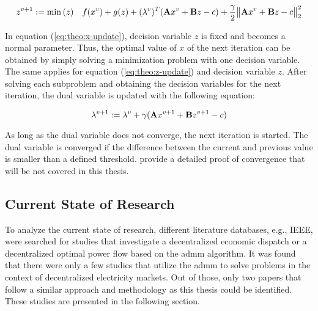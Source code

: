 \begin{equation}
	z^{v+1} := \min{(z)} \quad f(x^v) + g(z) + (\lambda^v)^T(\vb{A}x^v + \vb{B}z - c) + \frac{\gamma}{2}\big\| \vb{A}x^v + \vb{B}z - c \big\|^2_2 \label{eq:theo:z-update}
\end{equation}

In equation (\ref{eq:theo:x-update}), decision variable $z$ is fixed and becomes a normal parameter. Thus, the optimal value of $x$ of the next iteration can be obtained by simply solving a minimization problem with one decision variable. The same applies for equation (\ref{eq:theo:z-update}) and decision variable $z$. After solving each subproblem and obtaining the decision variables for the next iteration, the dual variable is updated with the following equation: 

\begin{equation}
	\lambda^{v+1} :=  \lambda^{v} + \gamma(\vb{A}x^{v+1} + \vb{B}z^{v+1} - c)
\end{equation}

As long as the dual variable does not converge, the next iteration is started. The dual variable is converged if the difference between the current and previous value is smaller than a defined threshold. \citet{boyd2010} provide a detailed proof of convergence that will be not covered in this thesis.

\subsection{Current State of Research}

To analyze the current state of research, different literature databases, e.g., IEEE, were searched for studies that investigate a decentralized economic dispatch or a decentralized optimal power flow based on the \gls{admm} algorithm. It was found that there were only a few studies that utilize the \gls{admm} to solve problems in the context of decentralized electricity markets. Out of those, only two papers that follow a similar approach and methodology as this thesis could be identified. These studies are presented in the following section. \\

